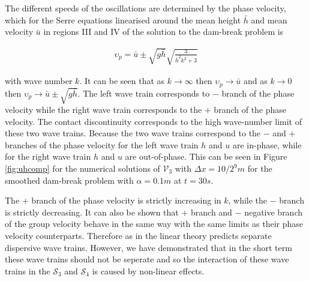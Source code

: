 \documentclass[times]{elsarticle}
\begin{document}
The different speeds of the oscillations are determined by the phase velocity, which for the Serre equations linearised around the mean height $\bar{h}$ and mean velocity $\bar{u}$ in regions III and IV of the solution to the dam-break problem is
\begin{linenomath*}
	\begin{gather}
	\upsilon_p = \bar{u} \pm \sqrt{g\bar{h}} \sqrt{\frac{3}{\bar{h}^2 k^2 + 3}}
	\label{eq:cd}
	\end{gather}
\end{linenomath*}
with wave number $k$. It can be seen that as $k \rightarrow \infty$ then $\upsilon_p \rightarrow \bar{u}$ and as $k \rightarrow 0$ then $\upsilon_p \rightarrow \bar{u} \pm \sqrt{g\bar{h}}$. The left wave train corresponds to $-$ branch of the phase velocity while the right wave train corresponds to the $+$ branch of the phase velocity. The contact discontinuity corresponds to the high wave-number limit of these two wave trains. Because the two wave trains correspond to the $-$ and $+$ branches of the phase velocity for the left wave train $h$ and $u$ are in-phase, while for the right wave train $h$ and $u$ are out-of-phase. This can be seen in Figure \ref{fig:uhcomp} for the numerical solutions of $\mathcal{V}_3$ with $\Delta x = 10/2^{9}m$ for the smoothed dam-break problem with $\alpha = 0.1m$ at $t=30s$.

The $+$ branch of the phase velocity is strictly increasing in $k$, while the $-$ branch is strictly decreasing. It can also be shown that $+$ branch and $-$ negative branch of  the group velocity behave in the same way with the same limits as their phase velocity counterparts. Therefore as in \citet{Dougalis-etal-2007} the linear theory predicts separate dispersive wave trains. However, we have demonstrated that in the short term these wave trains should not be seperate and so the interaction of these wave trains in the $\mathcal{S}_3$ and $\mathcal{S}_4$ is caused by non-linear effects.
\end{document}
